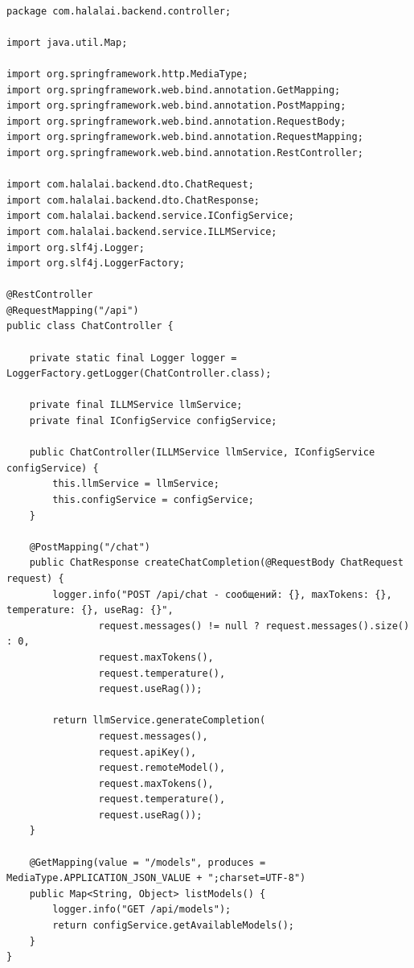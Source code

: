 \begin{lstlisting}[basicstyle=\tiny\ttfamily,breaklines=true]

package com.halalai.backend.controller;

import java.util.Map;

import org.springframework.http.MediaType;
import org.springframework.web.bind.annotation.GetMapping;
import org.springframework.web.bind.annotation.PostMapping;
import org.springframework.web.bind.annotation.RequestBody;
import org.springframework.web.bind.annotation.RequestMapping;
import org.springframework.web.bind.annotation.RestController;

import com.halalai.backend.dto.ChatRequest;
import com.halalai.backend.dto.ChatResponse;
import com.halalai.backend.service.IConfigService;
import com.halalai.backend.service.ILLMService;
import org.slf4j.Logger;
import org.slf4j.LoggerFactory;

@RestController
@RequestMapping("/api")
public class ChatController {

    private static final Logger logger = LoggerFactory.getLogger(ChatController.class);

    private final ILLMService llmService;
    private final IConfigService configService;

    public ChatController(ILLMService llmService, IConfigService configService) {
        this.llmService = llmService;
        this.configService = configService;
    }

    @PostMapping("/chat")
    public ChatResponse createChatCompletion(@RequestBody ChatRequest request) {
        logger.info("POST /api/chat - сообщений: {}, maxTokens: {}, temperature: {}, useRag: {}",
                request.messages() != null ? request.messages().size() : 0,
                request.maxTokens(),
                request.temperature(),
                request.useRag());

        return llmService.generateCompletion(
                request.messages(),
                request.apiKey(),
                request.remoteModel(),
                request.maxTokens(),
                request.temperature(),
                request.useRag());
    }

    @GetMapping(value = "/models", produces = MediaType.APPLICATION_JSON_VALUE + ";charset=UTF-8")
    public Map<String, Object> listModels() {
        logger.info("GET /api/models");
        return configService.getAvailableModels();
    }
}
\end{lstlisting}

